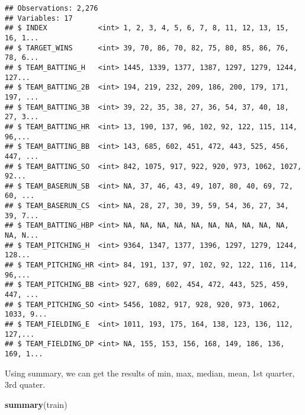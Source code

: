 \documentclass[]{article}
\newenvironment{Shaded}{\begin{snugshade}}{\end{snugshade}}
\newcommand{\KeywordTok}[1]{\textcolor[rgb]{0.13,0.29,0.53}{\textbf{#1}}}
\newcommand{\NormalTok}[1]{#1}
\begin{document}
\begin{verbatim}
## Observations: 2,276
## Variables: 17
## $ INDEX            <int> 1, 2, 3, 4, 5, 6, 7, 8, 11, 12, 13, 15, 16, 1...
## $ TARGET_WINS      <int> 39, 70, 86, 70, 82, 75, 80, 85, 86, 76, 78, 6...
## $ TEAM_BATTING_H   <int> 1445, 1339, 1377, 1387, 1297, 1279, 1244, 127...
## $ TEAM_BATTING_2B  <int> 194, 219, 232, 209, 186, 200, 179, 171, 197, ...
## $ TEAM_BATTING_3B  <int> 39, 22, 35, 38, 27, 36, 54, 37, 40, 18, 27, 3...
## $ TEAM_BATTING_HR  <int> 13, 190, 137, 96, 102, 92, 122, 115, 114, 96,...
## $ TEAM_BATTING_BB  <int> 143, 685, 602, 451, 472, 443, 525, 456, 447, ...
## $ TEAM_BATTING_SO  <int> 842, 1075, 917, 922, 920, 973, 1062, 1027, 92...
## $ TEAM_BASERUN_SB  <int> NA, 37, 46, 43, 49, 107, 80, 40, 69, 72, 60, ...
## $ TEAM_BASERUN_CS  <int> NA, 28, 27, 30, 39, 59, 54, 36, 27, 34, 39, 7...
## $ TEAM_BATTING_HBP <int> NA, NA, NA, NA, NA, NA, NA, NA, NA, NA, NA, N...
## $ TEAM_PITCHING_H  <int> 9364, 1347, 1377, 1396, 1297, 1279, 1244, 128...
## $ TEAM_PITCHING_HR <int> 84, 191, 137, 97, 102, 92, 122, 116, 114, 96,...
## $ TEAM_PITCHING_BB <int> 927, 689, 602, 454, 472, 443, 525, 459, 447, ...
## $ TEAM_PITCHING_SO <int> 5456, 1082, 917, 928, 920, 973, 1062, 1033, 9...
## $ TEAM_FIELDING_E  <int> 1011, 193, 175, 164, 138, 123, 136, 112, 127,...
## $ TEAM_FIELDING_DP <int> NA, 155, 153, 156, 168, 149, 186, 136, 169, 1...
\end{verbatim}

Using summary, we can get the results of min, max, median, mean, 1st
quarter, 3rd quater.

\begin{Shaded}
\begin{Highlighting}[]
\KeywordTok{summary}\NormalTok{(train)}
\end{Highlighting}
\end{Shaded}
\end{document}
